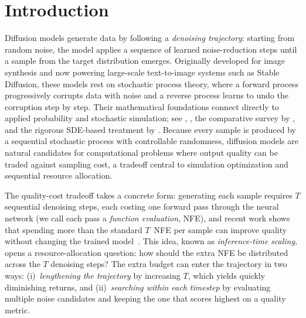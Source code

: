 \section{Introduction}
\label{sec:intro}

Diffusion models generate data by following a \emph{denoising trajectory}: starting
from random noise, the model applies a sequence of learned noise-reduction steps
until a sample from the target distribution emerges.
Originally developed for image synthesis and now powering large-scale
text-to-image systems such as Stable Diffusion, these models rest on stochastic
process theory, where a forward process progressively corrupts data with noise
and a reverse process learns to undo the corruption step by step.
Their mathematical foundations connect directly to applied probability and
stochastic simulation; see
\citet{song2019generative}, \citet{ho2020denoising}, the comparative survey
by \citet{cao2024comparative}, and the rigorous SDE-based treatment
by \citet{tang2024sde}.
Because every sample is produced by a sequential stochastic process with
controllable randomness, diffusion models are natural candidates for
computational problems where output quality can be traded against sampling
cost, a tradeoff central to simulation optimization and sequential resource
allocation.

The quality-cost tradeoff takes a concrete form: generating each sample
requires $T$ sequential denoising steps, each costing one forward pass
through the neural network (we call each pass a \emph{function evaluation},
NFE), and recent work shows that spending more than the standard $T$~NFE
per sample can improve quality without changing the trained
model~\citep{ma2024inference,ramesh2025nts}.
This idea, known as \emph{inference-time scaling}, opens a
resource-allocation question: how should the extra NFE be distributed
across the $T$ denoising steps?
The extra budget can enter the trajectory in two ways:
(i)~\emph{lengthening the trajectory} by increasing $T$, which yields quickly
diminishing returns, and
(ii)~\emph{searching within each timestep} by evaluating multiple noise
candidates and keeping the one that scores highest on a quality metric.

